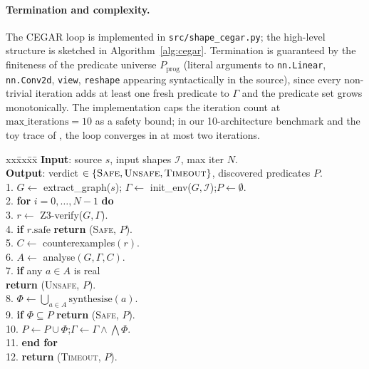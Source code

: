 \documentclass{article}
\theoremstyle{plain}
\theoremstyle{definition}
\newcommand{\code}[1]{\texttt{\small #1}}
\begin{document}
\paragraph{Termination and complexity.}
The CEGAR loop is implemented in
\code{src/shape\_cegar.py}; the high-level structure is sketched in
Algorithm~\ref{alg:cegar}.  Termination is guaranteed by the
finiteness of the predicate universe $P_\text{prog}$ (literal
arguments to \code{nn.Linear}, \code{nn.Conv2d}, \code{view},
\code{reshape} appearing syntactically in the source), since every
non-trivial iteration adds at least one fresh predicate to
$\Gamma$ and the predicate set grows monotonically.  The implementation
caps the iteration count at $\text{max\_iterations} = 10$ as a
safety bound; in our 10-architecture benchmark and the toy trace
of , the loop converges in at most two
iterations.

\begin{algorithm}[t]
\small
\caption{Shape CEGAR loop (paraphrased from
\code{src/shape\_cegar.py:ShapeCEGARLoop.run}).}
\label{alg:cegar}
\begin{tabbing}
xx\=xx\=xx\=\kill
\textbf{Input}: source $s$, input shapes $\mathcal{I}$, max iter $N$. \\
\textbf{Output}: verdict $\in\{\textsc{Safe},\textsc{Unsafe},
                                \textsc{Timeout}\}$,
                 discovered predicates $P$. \\[2pt]
1. \> $G \gets$ extract\_graph($s$);\quad
       $\Gamma \gets$ init\_env($G,\mathcal{I}$);\quad $P \gets \emptyset$. \\
2. \> \textbf{for} $i = 0,\ldots,N{-}1$ \textbf{do} \\
3. \> \> $r \gets$ Z3-verify($G,\Gamma$). \\
4. \> \> \textbf{if} $r.\text{safe}$ \textbf{return} (\textsc{Safe}, $P$). \\
5. \> \> $C \gets$ counterexamples$(r)$. \\
6. \> \> $A \gets$ analyse$(G, \Gamma, C)$. \\
7. \> \> \textbf{if} any $a\in A$ is real \\
   \> \> \> \textbf{return} (\textsc{Unsafe}, $P$). \\
8. \> \> $\Phi \gets \bigcup_{a\in A} \text{synthesise}(a)$. \\
9. \> \> \textbf{if} $\Phi \subseteq P$ \textbf{return} (\textsc{Safe}, $P$). \\
10.\> \> $P \gets P \cup \Phi$;\quad $\Gamma \gets \Gamma \wedge \bigwedge \Phi$. \\
11.\> \textbf{end for} \\
12.\> \textbf{return} (\textsc{Timeout}, $P$).
\end{tabbing}
\end{algorithm}
\end{document}

